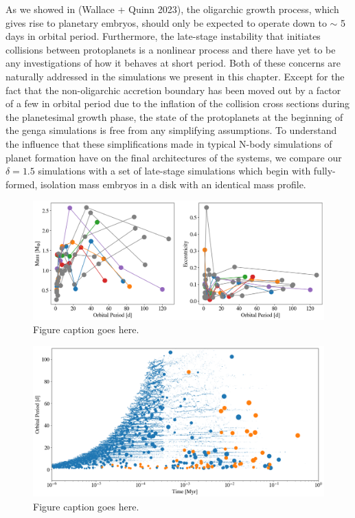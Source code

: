 As we showed in (Wallace + Quinn 2023), the oligarchic growth process, which gives rise to planetary embryos, should only be expected to operate down to $\sim$ 5 days in orbital period. Furthermore, the late-stage instability that initiates collisions between protoplanets is a nonlinear process and there have yet to be any investigations of how it behaves at short period. Both of these concerns are naturally addressed in the simulations we present in this chapter. Except for the fact that the non-oligarchic accretion boundary has been moved out by a factor of a few in orbital period due to the inflation of the collision cross sections during the planetesimal growth phase, the state of the protoplanets at the beginning of the {\sc genga} simulations is free from any simplifying assumptions. To understand the influence that these simplifications made in typical N-body simulations of planet formation have on the final architectures of the systems, we compare our $\delta = 1.5$ simulations with a set of late-stage simulations which begin with fully-formed, isolation mass embryos in a disk with an identical mass profile.

\begin{figure}
\begin{center}
    \includegraphics[width=\textwidth]{figures/stip/per_mass_ecc_iso_comp.png}
    \caption{Figure caption goes here.\label{fig:per_mass_ecc_iso_comp}}
\end{center}
\end{figure}

\begin{figure}
\begin{center}
    \includegraphics[width=\textwidth]{figures/stip/full_coll_iso_comp.png}
    \caption{Figure caption goes here.\label{fig:full_coll_iso_comp}}
\end{center}
\end{figure}

